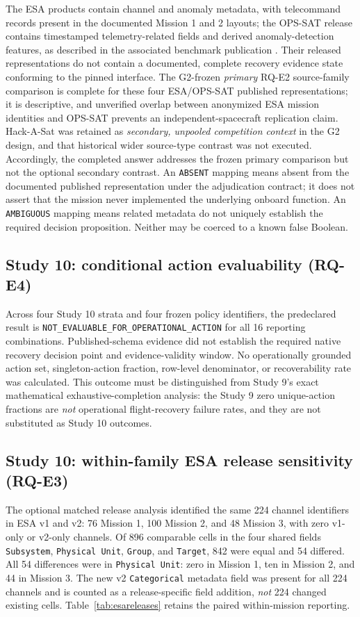 \documentclass[preprint,12pt]{elsarticle}
\begin{document}
The ESA products contain channel and anomaly metadata, with telecommand records present in the documented Mission 1 and 2 layouts; the OPS-SAT release contains timestamped telemetry-related fields and derived anomaly-detection features, as described in the associated benchmark publication \cite{ruszczak2025opssatbenchmark}. Their released representations do not contain a documented, complete recovery evidence state conforming to the pinned interface. The G2-frozen \emph{primary} RQ-E2 source-family comparison is complete for these four ESA/OPS-SAT published representations; it is descriptive, and unverified overlap between anonymized ESA mission identities and OPS-SAT prevents an independent-spacecraft replication claim. Hack-A-Sat was retained as \emph{secondary, unpooled competition context} in the G2 design, and that historical wider source-type contrast was not executed. Accordingly, the completed answer addresses the frozen primary comparison but not the optional secondary contrast. An \texttt{ABSENT} mapping means absent from the documented published representation under the adjudication contract; it does not assert that the mission never implemented the underlying onboard function. An \texttt{AMBIGUOUS} mapping means related metadata do not uniquely establish the required decision proposition. Neither may be coerced to a known false Boolean.

\subsection{Study 10: conditional action evaluability (RQ-E4)}
Across four Study 10 strata and four frozen policy identifiers, the predeclared result is \texttt{NOT\_EVALUABLE\_FOR\_OPERATIONAL\_ACTION} for all 16 reporting combinations. Published-schema evidence did not establish the required native recovery decision point and evidence-validity window. No operationally grounded action set, singleton-action fraction, row-level denominator, or recoverability rate was calculated. This outcome must be distinguished from Study 9's exact mathematical exhaustive-completion analysis: the Study 9 zero unique-action fractions are \emph{not} operational flight-recovery failure rates, and they are not substituted as Study 10 outcomes.

\subsection{Study 10: within-family ESA release sensitivity (RQ-E3)}
The optional matched release analysis identified the same 224 channel identifiers in ESA v1 and v2: 76 Mission 1, 100 Mission 2, and 48 Mission 3, with zero v1-only or v2-only channels. Of 896 comparable cells in the four shared fields \texttt{Subsystem}, \texttt{Physical Unit}, \texttt{Group}, and \texttt{Target}, 842 were equal and 54 differed. All 54 differences were in \texttt{Physical Unit}: zero in Mission 1, ten in Mission 2, and 44 in Mission 3. The new v2 \texttt{Categorical} metadata field was present for all 224 channels and is counted as a release-specific field addition, \emph{not} 224 changed existing cells. Table~\ref{tab:esareleases} retains the paired within-mission reporting.
\end{document}
